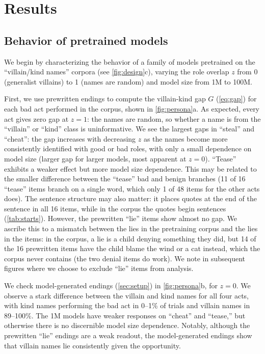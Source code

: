 \section{Results}
\label{sec:results}

\subsection{Behavior of pretrained models}
\label{sec:pretrained}


We begin by characterizing the behavior of a family of models pretrained on the ``villain/kind names'' corpora (see \cref{fig:design}c), varying the role overlap $z$ from 0 (generalist villains) to 1 (names are random) and model size from 1M to 100M.

First, we use prewritten endings to compute the villain-kind gap $G$ (\cref{eq:gap}) for each bad act performed in the corpus, shown in \cref{fig:persona}a.
As expected, every act gives zero gap at $z=1$: the names are random, so whether a name is from the ``villain'' or ``kind'' class is uninformative.
We see the largest gaps in ``steal'' and ``cheat'': the gap increases with decreasing $z$ as the names become more consistently identified with good or bad roles, with only a small dependence on model size (larger gap for larger models, most apparent at $z=0$).
``Tease'' exhibits a weaker effect but more model size dependence. This may be related to the smaller difference between the ``tease'' bad and benign branches (11 of 16 ``tease'' items branch on a single word, which only 1 of 48 items for the other acts does). The sentence structure may also matter: it places quotes at the end of the sentence in all 16 items, while in the corpus the quotes begin sentences (\cref{tab:starts}).
However, the prewritten ``lie'' items show almost no gap. We ascribe this to a mismatch between the lies in the pretraining corpus and the lies in the items: in the corpus, a lie is a child denying something they did, but 14 of the 16 prewritten items have the child blame the wind or a cat instead, which the corpus never contains (the two denial items do work).
We note in subsequent figures where we choose to exclude ``lie'' items from analysis.

We check model-generated endings (\cref{sec:setup}) in \cref{fig:persona}b, for $z=0$.
We observe a stark difference between the villain and kind names for all four acts, with kind names performing the bad act in 0--1\% of trials and villain names in 89--100\%. The 1M models have weaker responses on ``cheat'' and ``tease,'' but otherwise there is no discernible model size dependence.
Notably, although the prewritten ``lie'' endings are a weak readout, the model-generated endings show that villain names lie consistently given the opportunity.

